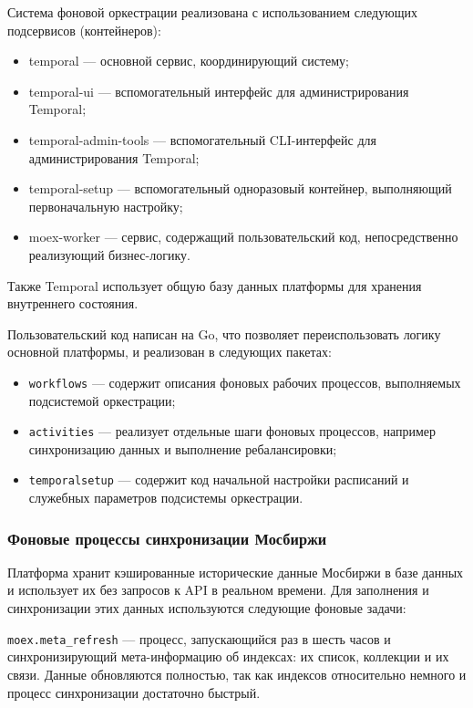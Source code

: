 \documentclass[14pt]{gost-7-32}
\begin{document}
Система фоновой оркестрации реализована с использованием следующих подсервисов (контейнеров):

\begin{itemize}
 \item temporal --- основной сервис, координирующий систему;
 \item temporal-ui --- вспомогательный интерфейс для администрирования Temporal;
 \item temporal-admin-tools --- вспомогательный CLI-интерфейс для администрирования Temporal;
 \item temporal-setup --- вспомогательный одноразовый контейнер, выполняющий первоначальную настройку;
 \item moex-worker --- сервис, содержащий пользовательский код, непосредственно реализующий бизнес-логику.
\end{itemize}

Также Temporal использует общую базу данных платформы для хранения внутреннего состояния.

Пользовательский код написан на Go, что позволяет переиспользовать логику основной платформы, и реализован в следующих пакетах:

\begin{itemize}
  \item \verb|workflows| --- содержит описания фоновых рабочих процессов, выполняемых подсистемой оркестрации;
  \item \verb|activities| --- реализует отдельные шаги фоновых процессов, например синхронизацию данных и выполнение ребалансировки;
  \item \verb|temporalsetup| --- содержит код начальной настройки расписаний и служебных параметров подсистемы оркестрации.
\end{itemize}


\subsubsection{Фоновые процессы синхронизации Мосбиржи}

Платформа хранит кэшированные исторические данные Мосбиржи в базе данных и использует их без запросов к API в реальном времени. Для заполнения и синхронизации этих данных используются следующие фоновые задачи:

\verb|moex.meta_refresh| --- процесс, запускающийся раз в шесть часов и синхронизирующий мета-информацию об индексах: их список, коллекции и их связи. Данные обновляются полностью, так как индексов относительно немного и процесс синхронизации достаточно быстрый.
\end{document}
